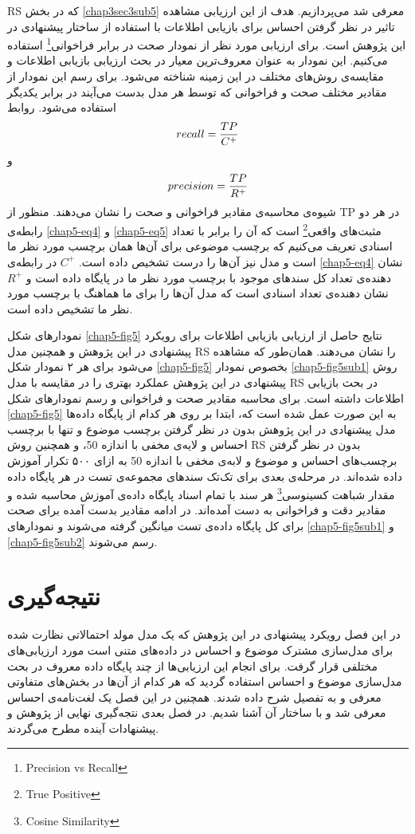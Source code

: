 RS
که در بخش
\ref{chap3sec3sub5}
معرفی‌ شد می‌‌پردازیم. هدف از این ارزیابی مشاهده تاثیر در نظر گرفتن احساس برای بازیابی اطلاعات با استفاده از ساختار پیشنهادی در این پژوهش است. برای ارزیابی مورد نظر از نمودار صحت در برابر فراخوانی\footnote{Precision vs Recall}
استفاده می‌‌کنیم. این نمودار به عنوان معروف‌ترین معیار در بحث ارزیابی بازیابی اطلاعات و مقایسه‌ی روش‌های مختلف در این زمینه شناخته می‌‌شود. برای رسم این نمودار از مقادیر مختلف صحت و فراخوانی که توسط هر مدل بدست می‌‌آیند در برابر یکدیگر استفاده می‌‌شود. روابط
\begin{align}
	\centering
	\label{chap5-eq4}
	recall = \dfrac{TP}{C^+}
\end{align}
و
\begin{align}
	\centering
	\label{chap5-eq5}
	precision = \dfrac{TP}{R^+}
\end{align}
شیوه‌ی محاسبه‌ی مقادیر فراخوانی و صحت را نشان می‌‌دهند. منظور از
TP
در هر دو رابطه‌ی
\ref{chap5-eq4}
و
\ref{chap5-eq5}
مثبت‌های واقعی‌\footnote{True Positive}
 است که آن را برابر با تعداد اسنادی تعریف می‌‌کنیم که برچسب موضوعی برای آن‌ها همان برچسب مورد نظر ما است و مدل نیز آن‌ها را 
درست تشخیص داده است.
$C^+$
در رابطه‌ی
\ref{chap5-eq4}
نشان دهنده‌ی تعداد کل سندهای موجود با برچسب مورد نظر ما در پایگاه داده است و
$R^+$
نشان دهنده‌ی تعداد اسنادی است که مدل آن‌ها را برای ما هماهنگ با برچسب مورد نظر ما تشخیص داده است.


نمودار‌های شکل
\ref{chap5-fig5}
نتایج حاصل از ارزیابی بازیابی اطلاعات برای رویکرد پیشنهادی در این پژوهش و همچنین مدل
RS
را نشان می‌‌دهند. همان‌طور که مشاهده می‌‌شود برای هر ۲ نمودار شکل
\ref{chap5-fig5}
بخصوص نمودار
\ref{chap5-fig5sub1}
روش پیشنهادی در این پژوهش عملکرد بهتری را در مقایسه با مدل
RS
در بحث بازیابی اطلاعات داشته است. برای محاسبه مقادیر صحت و فراخوانی و رسم نمودار‌های شکل
\ref{chap5-fig5}
به این صورت عمل شده است که، ابتدا بر روی هر کدام از پایگاه داده‌ها مدل پیشنهادی در این پژوهش بدون در نظر گرفتن برچسب موضوع و تنها با برچسب احساس و لایه‌ی مخفی با اندازه 50، و همچنین روش
RS
بدون در نظر گرفتن برچسب‌های احساس و موضوع و لابه‌ی مخفی با اندازه 50 به ازای ۵۰۰ تکرار آموزش داده شده‌اند. در مرحله‌ی بعدی برای تک‌تک سند‌های مجموعه‌ی تست در هر پایگاه داده مقدار شباهت کسینوسی\footnote{Cosine Similarity}
هر سند با تمام اسناد پایگاه داده‌ی آموزش محاسبه شده و مقادیر دقت و فراخوانی به دست آمده‌اند. در ادامه مقادیر بدست آمده برای صحت برای کل پایگاه داده‌ی تست میانگین گرفته می‌‌شوند و نمودار‌های
\ref{chap5-fig5sub1}
و
\ref{chap5-fig5sub2}
رسم می‌‌شوند.

\section{نتیجه‌گیری}
در این فصل رویکرد پیشنهادی در این پژوهش که یک مدل مولد احتمالاتی نظارت شده برای مدل‌سازی مشترک موضوع و احساس در داده‌های متنی است مورد ارزیابی‌های مختلفی‌ قرار گرفت.  برای انجام این ارزیابی‌ها از چند پایگاه داده معروف در بحث مدل‌سازی موضوع و احساس استفاده گردید که هر کدام از آن‌ها در بخش‌های متفاوتی معرفی‌ و به تفصیل شرح داده شدند. همچنین در این فصل یک لغت‌نامه‌ی احساس معرفی‌ شد و با ساختار آن آشنا شدیم. در فصل بعدی نتجه‌گیری نهایی از پژوهش و پیشنهادات آینده مطرح می‌گردند.
